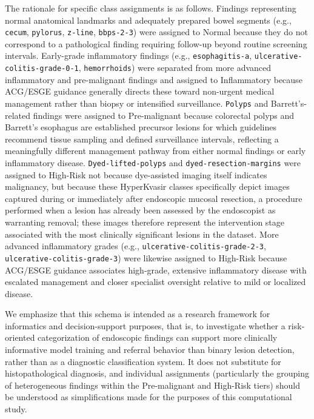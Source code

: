 \documentclass[11pt,a4paper]{article}
\begin{document}
The rationale for specific class assignments is as follows. Findings
representing normal anatomical landmarks and adequately prepared bowel
segments (e.g., \texttt{cecum}, \texttt{pylorus}, \texttt{z-line},
\texttt{bbps-2-3}) were assigned to Normal because they do not
correspond to a pathological finding requiring follow-up beyond routine
screening intervals. Early-grade inflammatory findings (e.g.,
\texttt{esophagitis-a}, \texttt{ulcerative-colitis-grade-0-1},
\texttt{hemorrhoids}) were separated from more advanced inflammatory and
pre-malignant findings and assigned to Inflammatory because ACG/ESGE
guidance generally directs these toward non-urgent medical management rather
than biopsy or intensified surveillance. \texttt{Polyps} and Barrett's-related
findings were assigned to Pre-malignant because colorectal polyps
and Barrett's esophagus are established precursor lesions for which
guidelines recommend tissue sampling and defined surveillance intervals,
reflecting a meaningfully different management pathway from either normal
findings or early inflammatory disease. \texttt{Dyed-lifted-polyps} and
\texttt{dyed-resection-margins} were assigned to High-Risk not
because dye-assisted imaging itself indicates malignancy, but because these
HyperKvasir classes specifically depict images captured during or
immediately after endoscopic mucosal resection, a procedure performed when a
lesion has already been assessed by the endoscopist as warranting removal;
these images therefore represent the intervention stage associated with the
most clinically significant lesions in the dataset. More advanced
inflammatory grades (e.g., \texttt{ulcerative-colitis-grade-2-3},
\texttt{ulcerative-colitis-grade-3}) were likewise assigned to
High-Risk because ACG/ESGE guidance associates high-grade,
extensive inflammatory disease with escalated management and closer
specialist oversight relative to mild or localized disease.

We emphasize that this schema is intended as a research framework for
informatics and decision-support purposes, that is, to investigate whether
a risk-oriented categorization of endoscopic findings can support more
clinically informative model training and referral behavior than binary
lesion detection, rather than as a diagnostic classification system. It
does not substitute for histopathological diagnosis, and individual
assignments (particularly the grouping of heterogeneous findings within the
Pre-malignant and High-Risk tiers) should be understood as simplifications
made for the purposes of this computational study.
\end{document}
